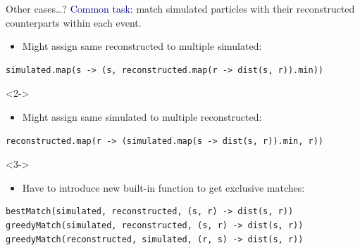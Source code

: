 \documentclass{beamer}
\begin{document}
\begin{frame}[fragile]{Other cases\ldots?}
\vspace{0.5 cm}
\textcolor{darkblue}{Common task:} match simulated particles with their reconstructed counterparts within each event.

\vspace{0.25 cm}
\begin{itemize}
\item Might assign same reconstructed to multiple simulated:
\end{itemize}
\scriptsize
\begin{verbatim}
simulated.map(s -> (s, reconstructed.map(r -> dist(s, r)).min))
\end{verbatim}
\normalsize

\vspace{0.25 cm}
\begin{uncoverenv}<2->
\begin{itemize}
\item Might assign same simulated to multiple reconstructed:
\end{itemize}
\scriptsize
\begin{verbatim}
reconstructed.map(r -> (simulated.map(s -> dist(s, r)).min, r))
\end{verbatim}
\normalsize
\end{uncoverenv}

\vspace{0.25 cm}
\begin{uncoverenv}<3->
\begin{itemize}
\item Have to introduce new built-in function to get exclusive matches:
\end{itemize}
\scriptsize
\begin{verbatim}
bestMatch(simulated, reconstructed, (s, r) -> dist(s, r))
greedyMatch(simulated, reconstructed, (s, r) -> dist(s, r))
greedyMatch(reconstructed, simulated, (r, s) -> dist(s, r))
\end{verbatim}
\normalsize
\end{uncoverenv}
\end{frame}
\end{document}
